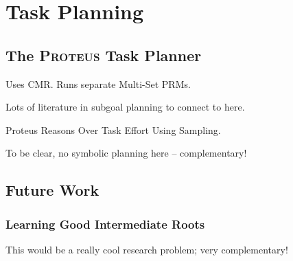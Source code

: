 \chapter{Task Planning}
\label{chap:task-planning}

\section{The \textsc{Proteus} Task Planner}

Uses CMR.
Runs separate Multi-Set PRMs.

Lots of literature in subgoal planning to connect to here.

Proteus Reasons Over Task Effort Using Sampling.

To be clear, no symbolic planning here --
complementary!

\section{Future Work}

\subsection{Learning Good Intermediate Roots}
\label{subsec:learning-good-intermediate-roots}

This would be a really cool research problem;
very complementary!
